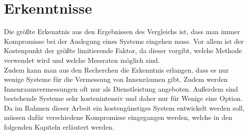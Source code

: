 \section{Erkenntnisse}
Die größte Erkenntnis aus den Ergebnissen des Vergleichs ist, dass man immer Kompromisse bei der Auslegung eines Systems eingehen muss. Vor allem ist der Kostenpunkt der größte limitierende Faktor, da dieser vorgibt, welche Methode verwendet wird und welche Messraten möglich sind. \\
Zudem kann man aus den Recherchen die Erkenntnis erlangen, dass es nur wenige Systeme für die Vermessung von Innenräumen gibt. Zudem werden Innenraumvermessungen oft nur als Dienstleistung angeboten. Außerdem sind bestehende Systeme sehr kostenintensiv und daher nur für Wenige eine Option.\\
Da im Rahmen dieser Arbeit ein kostengünstiges System entwickelt werden soll, müssen dafür verschiedene Kompromisse eingegangen werden, welche in den folgenden Kapiteln erläutert werden.

